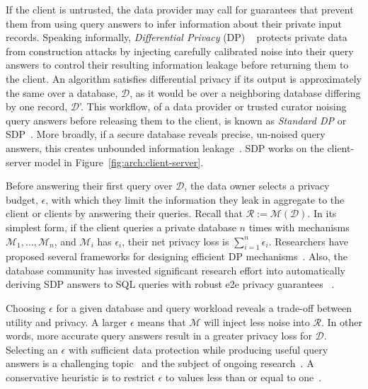 \documentclass[11pt]{article}
\newcommand{\mechanism}{$\mathcal{M}$\xspace}
\newcommand{\db}{$\mathcal{D}$\xspace}
\newcommand{\eps}{$\epsilon$\xspace}
\newcommand{\answer}{$\mathcal{R}$\xspace}
\begin{document}
If the client is untrusted, the data provider may call for guarantees that prevent them from using query answers to infer information about their private input records. Speaking informally, {\em Differential Privacy} (DP) ~\cite{dp2006, dwork2008differential} protects private data from construction attacks by injecting carefully calibrated noise into their query answers to control their resulting information leakage before returning them to the client.   An algorithm satisfies differential privacy if its output is approximately the same over a database, \db, as it would be over a neighboring database differing by one record, \db'. This workflow, of a data provider or trusted curator noising query answers before releasing them to the client, is known as {\em Standard DP} or SDP~\cite{wagh2021dp}.     More broadly, if a secure database reveals precise, un-noised query answers, this creates unbounded information leakage~\cite{kifer2011no}.  SDP works on the client-server model in Figure~\ref{fig:arch:client-server}. 

Before answering their first query over \db, the data owner selects a privacy budget, \eps, with which they limit the information they leak in aggregate to the client or clients by answering their queries.  Recall that $\mathcal{R} := \mathcal{M}(\mathcal{D})$.   In its simplest form, if the client queries a private database $n$ times with mechanisms $\mathcal{M}_1, \ldots, \mathcal{M}_n$, and $\mathcal{M}_i$ has $\epsilon_i$, their net privacy loss is $\sum_{i=1}^n \epsilon_i$.  Researchers have proposed several frameworks for designing efficient DP mechanisms~\cite{johnson2020chorus, zhang2018ektelo, wang2021dpgen}.  Also, the database community has invested significant research effort into automatically deriving SDP answers to SQL queries with robust e2e  privacy guarantees ~\cite{ann2011airavat,mcsherry2009privacy,proserpio2014calibrating,johnson2018towards,kotsogiannis2019architecting, kotsogiannis2019privatesql}.



Choosing \eps for a given database and query workload reveals a trade-off between utility and privacy.  A larger \eps means that \mechanism will inject less noise into \answer.  In other words, more accurate query answers result in a greater privacy loss for \db.   Selecting an \eps with sufficient data protection while producing useful query answers is a challenging topic~\cite{lee2011much} and the subject of ongoing research~\cite{dwork2019differential, li2023towards, near2023guidelines}.  A conservative heuristic is to restrict $\epsilon$ to values less than or equal to one~\cite{wood2018differential}.
\end{document}
